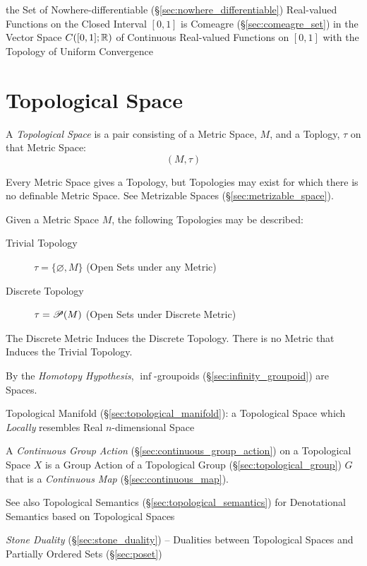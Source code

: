 the Set of Nowhere-differentiable (\S\ref{sec:nowhere_differentiable})
Real-valued Functions on the Closed Interval $[0,1]$ is Comeagre
(\S\ref{sec:comeagre_set}) in the Vector Space $C([0,1]; \mathbb{R})$ of Continuous
Real-valued Functions on $[0,1]$ with the Topology of Uniform Convergence



\section{Topological Space}\label{sec:topological_space}

A \emph{Topological Space} is a pair consisting of a Metric Space,
$M$, and a Toplogy, $\tau$ on that Metric Space:
\[
  (M,\tau)
\]

Every Metric Space gives a Topology, but Topologies may exist for
which there is no definable Metric Space. See Metrizable Spaces
(\S\ref{sec:metrizable_space}).

Given a Metric Space $M$, the following Topologies may be described:
\begin{description}
\item[Trivial Topology] $\tau = \{\varnothing, M\}$ (Open Sets under
  any Metric)

\item[Discrete Topology] $\tau = \mathscr{P}(M)$ (Open Sets under
  Discrete Metric)
\end{description}
The Discrete Metric Induces the Discrete Topology. There is no Metric
that Induces the Trivial Topology.

By the \emph{Homotopy Hypothesis}, $\inf$-groupoids
(\S\ref{sec:infinity_groupoid}) are Spaces.

\fist Topological Manifold (\S\ref{sec:topological_manifold}): a Topological
Space which \emph{Locally} resembles Real $n$-dimensional Space

A \emph{Continuous Group Action} (\S\ref{sec:continuous_group_action}) on a
Topological Space $X$ is a Group Action of a Topological Group
(\S\ref{sec:topological_group}) $G$ that is a \emph{Continuous Map}
(\S\ref{sec:continuous_map}).

\fist See also Topological Semantics
(\S\ref{sec:topological_semantics}) for Denotational Semantics based
on Topological Spaces

\emph{Stone Duality} (\S\ref{sec:stone_duality}) -- Dualities between
Topological Spaces and Partially Ordered Sets (\S\ref{sec:poset})

